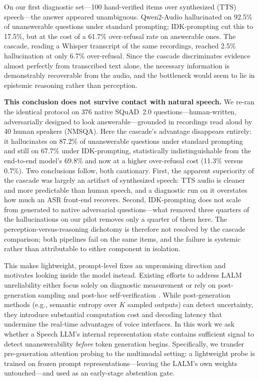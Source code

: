 On our first diagnostic set---100 hand-verified items over synthesized (TTS) speech---the answer appeared unambiguous. Qwen2-Audio hallucinated on 92.5\% of unanswerable questions under standard prompting; IDK-prompting cut this to 17.5\%, but at the cost of a 61.7\% over-refusal rate on answerable ones. The cascade, reading a Whisper transcript of the same recordings, reached 2.5\% hallucination at only 6.7\% over-refusal. Since the cascade discriminates evidence almost perfectly from transcribed text alone, the necessary information is demonstrably recoverable from the audio, and the bottleneck would seem to lie in epistemic reasoning rather than perception.

\textbf{This conclusion does not survive contact with natural speech.} We re-ran the identical protocol on 376 native SQuAD~2.0 questions---human-written, adversarially designed to look answerable---grounded in recordings read aloud by 40 human speakers (NMSQA). Here the cascade's advantage disappears entirely: it hallucinates on 87.2\% of unanswerable questions under standard prompting and still on 67.7\% under IDK-prompting, statistically indistinguishable from the end-to-end model's 69.8\% and now at a higher over-refusal cost (11.3\% versus 0.7\%). Two conclusions follow, both cautionary. First, the apparent superiority of the cascade was largely an artifact of synthesized speech: TTS audio is cleaner and more predictable than human speech, and a diagnostic run on it overstates how much an ASR front-end recovers. Second, IDK-prompting does not scale from generated to native adversarial questions---what removed three quarters of the hallucinations on our pilot removes only a quarter of them here. The perception-versus-reasoning dichotomy is therefore not resolved by the cascade comparison; both pipelines fail on the same items, and the failure is systemic rather than attributable to either component in isolation.

This makes lightweight, prompt-level fixes an unpromising direction and motivates looking inside the model instead. Existing efforts to address LALM unreliability either focus solely on diagnostic measurement \cite{kuan2026aquabench, zhao2026halluaudio} or rely on post-generation sampling and post-hoc self-verification \cite{kuan2026uncertainty}. While post-generation methods (e.g., semantic entropy over $K$ sampled outputs) can detect uncertainty, they introduce substantial computation cost and decoding latency that undermine the real-time advantages of voice interfaces. In this work we ask whether a Speech LLM's internal representation state contains sufficient signal to detect unanswerability \textit{before} token generation begins. Specifically, we transfer pre-generation attention probing \cite{miftakhova2026probing} to the multimodal setting: a lightweight probe is trained on frozen prompt representations---leaving the LALM's own weights untouched---and used as an early-stage abstention gate.

